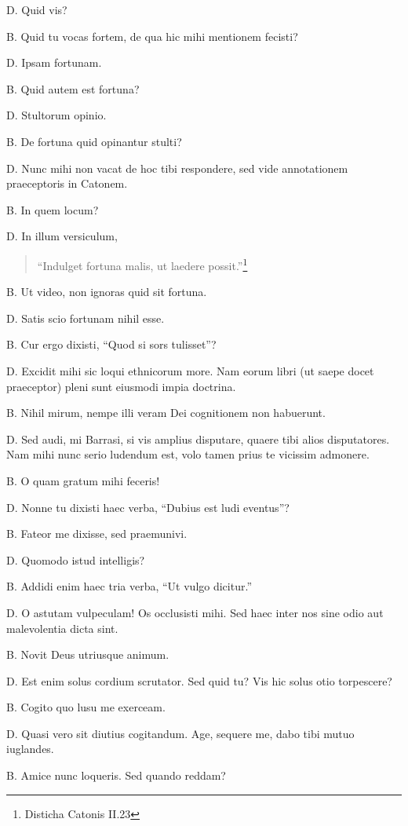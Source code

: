 \documentclass{article}
\begin{document}
D. Quid vis?

B. Quid tu vocas fortem, de qua hic mihi mentionem fecisti?

D. Ipsam fortunam. 

B. Quid autem est fortuna?

D. Stultorum opinio. 

B. De fortuna quid opinantur stulti?

D. Nunc mihi non vacat de hoc tibi respondere, sed vide annotationem praeceptoris in Catonem. 

B. In quem locum?

D. In illum versiculum,\begin{verse} ``Indulget fortuna malis, ut laedere possit.''\footnote{Disticha Catonis II.23}\end{verse}

B. Ut video, non ignoras quid sit fortuna. 

D. Satis scio fortunam nihil esse. 

B. Cur ergo dixisti, ``Quod si sors tulisset''?

D. Excidit mihi sic loqui ethnicorum more. Nam eorum libri (ut saepe docet praeceptor) pleni sunt eiusmodi impia doctrina. 

B. Nihil mirum, nempe illi veram Dei cognitionem non habuerunt. 

D. Sed audi, mi Barrasi, si vis amplius disputare, quaere tibi alios disputatores. Nam mihi nunc serio ludendum est, volo tamen prius te vicissim admonere. 

B. O quam gratum mihi feceris!

D. Nonne tu dixisti haec verba, ``Dubius est ludi eventus''?

B. Fateor me dixisse, sed praemunivi. 

D. Quomodo istud intelligis?

B. Addidi enim haec tria verba, ``Ut vulgo dicitur.''

D. O astutam vulpeculam! Os occlusisti mihi. Sed haec inter nos sine odio aut malevolentia dicta sint. 

B. Novit Deus utriusque animum. 

D. Est enim solus cordium scrutator. Sed quid tu? Vis hic solus otio torpescere?

B. Cogito quo lusu me exerceam. 

D. Quasi vero sit diutius cogitandum. Age, sequere me, dabo tibi mutuo iuglandes. 

B. Amice nunc loqueris. Sed quando reddam?
\end{document}

